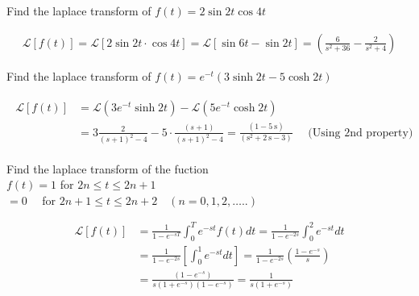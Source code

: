 \begin{exercise}
	Find the laplace transform of $f(t)=2 \sin 2 t \cos 4 t$
\end{exercise}
\begin{answer}
	\begin{align*}
	\mathcal{L}[f(t)]=\mathcal{L}[2 \sin 2 t \cdot \cos 4 t]=\mathcal{L}[\sin 6 t-\sin 2 t]=\left(\frac{6}{s^{2}+36}-\frac{2}{s^{2}+4}\right)
	\end{align*}
\end{answer}
\begin{exercise}
	Find the laplace transform of $f(t)=e^{-t}(3 \sinh 2 t-5 \cosh 2 t)$
\end{exercise}
\begin{answer}
	\begin{align*}
	\begin{aligned}
	\mathcal{L}[f(t)] &=\mathcal{L}\left(3 e^{-t} \sinh 2 t\right)-\mathcal{L}\left(5 e^{-t} \cosh 2 t\right) \\
	&=3 \frac{2}{(s+1)^{2}-4}-5 \cdot \frac{(s+1)}{(s+1)^{2}-4}=\frac{(1-5 \mathrm{~s})}{\left(\mathrm{s}^{2}+2 \mathrm{~s}-3\right)} \quad \text { (Using 2nd property) }
	\end{aligned}
	\end{align*}
\end{answer}
\begin{exercise}
	Find the laplace transform of the fuction\\
	$f(t)=1$ for $2 n \leq t \leq 2 n+1$\\
	$=0 \quad$ for $2 n+1 \leq t \leq 2 n+2 \quad(n=0,1,2, \ldots . .)$
\end{exercise}
\begin{answer}
	\begin{align*}
	\mathcal{L}[f(t)] &=\frac{1}{1-e^{-s T}} \int_{0}^{T} e^{-s t} f(t) d t=\frac{1}{1-e^{-2 s}} \int_{0}^{2} e^{-s t} d t \\
	&=\frac{1}{1-e^{-2 s}}\left[\int_{0}^{1} e^{-s t} d t\right]=\frac{1}{1-e^{-2 s}}\left(\frac{1-e^{-s}}{s}\right)\\
	&=\frac{\left(1-e^{-s}\right)}{s\left(1+e^{-s}\right)\left(1-e^{-s}\right)}=\frac{1}{s\left(1+e^{-s}\right)}
	\end{align*}
\end{answer}

